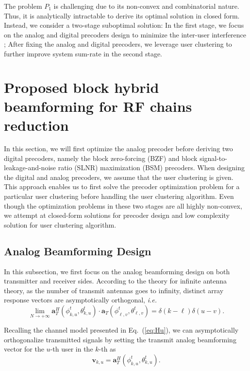 \documentclass[conference]{IEEEtran}
\begin{document}
{The problem $P_1$ is challenging due to its non-convex and combinatorial nature. Thus, it is analytically intractable to derive its optimal solution in closed form. Instead, we consider a two-stage suboptimal solution: In the first stage, we focus on the analog  and digital precoders design to minimize the inter-user interference ; After fixing the analog and digital precoders, we leverage user clustering to further improve system sum-rate in the second stage.

\section{Proposed block hybrid beamforming for RF chains reduction}
In this section, we will first optimize the analog precoder before deriving two digital precoders, namely the block zero-forcing (BZF) and block signal-to-leakage-and-noise ratio (SLNR) maximization (BSM) precoders. When designing the digital and analog precoders, we assume that the user clustering is given. This approach enables us to first solve the precoder optimization problem for a particular user clustering before handling the user clustering algorithm. Even though the optimization problems in these two stages are all highly non-convex, we attempt at closed-form solutions for precoder design and low complexity solution for user clustering algorithm.

\subsection{Analog Beamforming Design}\label{analog}
In this subsection, we first focus on the analog beamforming design on both transmitter and receiver sides. According to the theory for infinite antenna theory, as the number of transmit antennas goes to infinity, distinct array response vectors are asymptotically orthogonal, {\em i.e.}
\begin{equation}\label{Eq:assumption}
\lim_{N\rightarrow +\infty} \bm{a}_{T}^{H}(\phi^t_{k,u},\theta^t_{k,u}) \cdot\bm{a}_{T}(\phi^t_{\ell,v},\theta^t_{\ell,v})=\delta(k-\ell)\delta(u-v).
\end{equation}

Recalling the channel model presented in Eq.~(\ref{eq:Hu}), we can asymptotically orthogonalize transmitted signals by setting the transmit analog beamforming vector for the $u$-th user in the $k$-th as
\begin{equation}
\bm{v}_{k,u}=\bm{a}_{T}^{H}(\phi^t_{k,u},\theta^t_{k,u}).
\label{eq:vku}
\end{equation}

}
\end{document}
